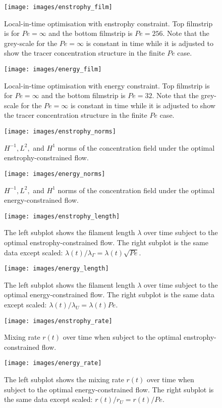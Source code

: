 \documentclass[12pt]{iopart}
\begin{document}
\begin{figure}
\texttt{[image: images/enstrophy\_film]}
\caption{Local-in-time optimisation with enstrophy constraint. Top filmstrip is for $Pe =\infty$ and the bottom filmstrip is $Pe=256$. Note that the grey-scale for the $Pe=\infty$ is constant in time while it is adjusted to show the tracer concentration structure in the finite $Pe$ case. }
\label{fig:enstrophy_film}
\end{figure}
%
\begin{figure}
\texttt{[image: images/energy\_film]}
\caption{Local-in-time optimisation with energy constraint. Top filmstrip is for $Pe = \infty$ and the bottom filmstrip is $Pe=32$. Note that the grey-scale for the $Pe=\infty$ is constant in time while it is adjusted to show the tracer concentration structure in the finite $Pe$ case. }
\label{fig:energy_film}
\end{figure}
%
\begin{figure}
\texttt{[image: images/enstrophy\_norms]}
\caption{$H^{-1}, L^{2},$ and $H^{1}$ norms of the concentration field under the optimal enstrophy-constrained flow.  }
\label{fig:enstrophy_norms}
\end{figure}
%
\begin{figure}
\texttt{[image: images/energy\_norms]}
\caption{$H^{-1}, L^{2},$ and $H^{1}$ norms of the concentration field under the optimal energy-constrained flow.}
\label{fig:energy_norms}
\end{figure}
%
\begin{figure}
\texttt{[image: images/enstrophy\_length]}
\caption{The left subplot shows the filament length $\lambda$ over time subject to the optimal enstrophy-constrained flow. The right subplot is the same data except scaled: $\lambda(t)/\lambda_{\Gamma} = \lambda(t)\sqrt{Pe}$.}
\label{fig:enstrophy_length}
\end{figure}
%
\begin{figure}
\texttt{[image: images/energy\_length]}
\caption{The left subplot shows the filament length $\lambda$ over time subject to the optimal energy-constrained flow. The right subplot is the same data except scaled: $\lambda(t)/\lambda_{U} = \lambda(t) Pe$.}
\label{fig:energy_length}
\end{figure}
%
\begin{figure}
\centering
\texttt{[image: images/enstrophy\_rate]}
\caption{Mixing rate $r(t)$ over time when subject to the optimal enstrophy-constrained flow.}
\label{fig:enstrophy_rate}
\end{figure}
%
\begin{figure}
\centering
\texttt{[image: images/energy\_rate]}
\caption{The left subplot shows the mixing rate $r(t)$ over time when subject to the optimal energy-constrained flow. The right subplot is the same data except scaled: $r(t)/r_{U} = r(t)/Pe$.}
\label{fig:energy_rate}
\end{figure}
\end{document}
